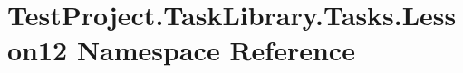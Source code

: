 \hypertarget{namespace_test_project_1_1_task_library_1_1_tasks_1_1_lesson12}{}\section{Test\+Project.\+Task\+Library.\+Tasks.\+Lesson12 Namespace Reference}
\label{namespace_test_project_1_1_task_library_1_1_tasks_1_1_lesson12}
